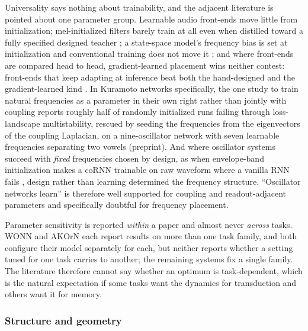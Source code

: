\documentclass[10pt]{article}
\begin{document}
Universality says nothing about trainability, and the adjacent
literature is pointed about one parameter group. Learnable audio
front-ends move little from initialization; mel-initialized filters
barely train at all even when distilled toward a fully specified
designed teacher \citep{murenn}; a state-space model's frequency bias is
set at initialization and conventional training does not move it
\citep{yu2025}; and where front-ends are compared head to head,
gradient-learned placement wins neither contest: front-ends that keep
adapting at inference beat both the hand-designed and the
gradient-learned kind \citep{ada-fe, leaf-apcen}. In Kuramoto networks
specifically, the one study to train natural frequencies as a parameter
in their own right rather than jointly with coupling \citep{ahmadi2026}
reports roughly half of randomly initialized runs failing through
loss-landscape multistability, rescued by seeding the frequencies from
the eigenvectors of the coupling Laplacian, on a nine-oscillator network
with seven learnable frequencies separating two vowels (preprint). And
where oscillator systems succeed with \emph{fixed} frequencies chosen by
design, as when envelope-band initialization makes a coRNN
\citep{rusch2021} trainable on raw waveform where a vanilla RNN fails
\citep{chandravadia2026}, design rather than learning determined the
frequency structure. ``Oscillator networks learn'' is therefore well
supported for coupling and readout-adjacent parameters and specifically
doubtful for frequency placement.

Parameter sensitivity is reported \emph{within} a paper and almost never
\emph{across} tasks. WONN \citep{wonn} and AKOrN \citep{akorn} each
report results on more than one task family, and both configure their
model separately for each, but neither reports whether a setting tuned
for one task carries to another; the remaining systems fix a single
family. The literature therefore cannot say whether an optimum is
task-dependent, which is the natural expectation if some tasks want the
dynamics for transduction and others want it for memory.

\subsubsection{Structure and geometry}\label{sec-3-1-3}
\end{document}

